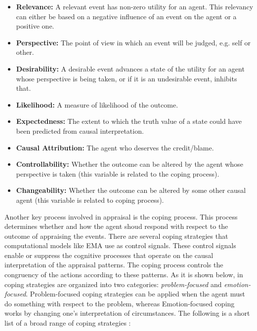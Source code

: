 \documentclass[11pt]{article}
\begin{document}
\begin{itemize}
  \item \textbf{Relevance:} A relevant event has non-zero utility for an agent.
  This relevancy can either be based on a negative influence of an event on the
  agent or a positive one.
  
  \item \textbf{Perspective:} The point of view in which an event will be
  judged, e.g. self or other.
  
  \item \textbf{Desirability:} A desirable event advances a state of the utility
  for an agent whose perspective is being taken, or if it is an
  undesirable event, inhibits that.
  
  \item \textbf{Likelihood:} A measure of likelihood of the outcome.
  
  \item \textbf{Expectedness:} The extent to which the truth value of a state
  could have been predicted from causal interpretation.
  
  \item \textbf{Causal Attribution:} The agent who deserves the credit/blame.
  
  \item \textbf{Controllability:} Whether the outcome can be altered by the
  agent whose perspective is taken (this variable is related to the coping
  process).
  
  \item \textbf{Changeability:} Whether the outcome can be altered by some other
  causal agent (this variable is related to coping process).
\end{itemize}

Another key process involved in appraisal is the coping process. This process
determines whether and how the agent shoud respond with respect to the outcome
of appraising the events. There are several coping strategies that computational
models like EMA \cite{gratch:domain-independent} use as control signals. These
control signals enable or suppress the cognitive processes that operate on the
causal interpretation of the appraisal patterns. The coping process controls the
congruency of the actions according to these patterns. As it is shown below, in
\cite{gratch:domain-independent} coping strategies are organized into two
categories: \textit{problem-focused} and \textit{emotion-focused}.
Problem-focused coping strategies can be applied when the agent must do
something with respect to the problem, whereas Emotion-focused coping works by
changing one's interpretation of circumstances. The following is a short list of
a broad range of coping strategies \cite{gratch:domain-independent}:
\end{document}

